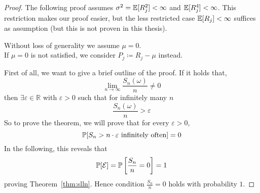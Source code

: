 \begin{proof}
  The following proof assumes $\sigma^2 = \mathbb E[R_j^2] < \infty$ and $\mathbb E[R_j^4] < \infty$.
  This restriction makes our proof easier, but the less restricted case $\mathbb E[R_j] < \infty$ suffices as assumption
  (but this is not proven in this thesis).

  Without loss of generality we assume $\mu = 0$. \\
  If $\mu = 0$ is not satisfied, we consider $P_j \coloneqq R_j - \mu$ instead.

  First of all, we want to give a brief outline of the proof. If it holds that,
  \[ \lim_{n\to\infty} \frac{S_n(\omega)}{n} \neq 0 \]
  then $\exists \varepsilon \in \mathbb R$ with $\varepsilon > 0$ such that for infinitely many $n$
  \[ \frac{S_n(\omega)}{n} > \varepsilon \]
  So to prove the theorem, we will prove that for every $\varepsilon > 0$,
  \[ \mathbb P[S_n > n \cdot \varepsilon \text{ infinitely often}] = 0 \]
  In the following, this reveals that
  \[ \mathbb P[\mathcal E] = \mathbb P\left[\frac{S_n}{n} = 0\right] = 1 \]
  proving Theorem~\ref{thm:slln}. Hence condition $\frac{S_n}{n} = 0$ holds with probability $1$.


\end{proof}
